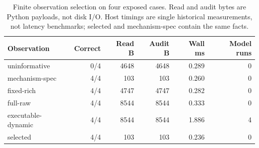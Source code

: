 \begin{table}[htbp]
\centering\small
\caption{Finite observation selection on four exposed cases. Read and audit bytes are Python payloads, not disk I/O. Host timings are single historical measurements, not latency benchmarks; selected and mechanism-spec contain the same facts.}
\label{tab:acquisition}
\begin{tabular}{@{}lrrrrr@{}}\toprule
Observation & Correct & Read B & Audit B & Wall ms & Model runs \\\midrule
uninformative & 0/4 & 4648 & 4648 & 0.289 & 0 \\
mechanism-spec & 4/4 & 103 & 103 & 0.260 & 0 \\
fixed-rich & 4/4 & 4747 & 4747 & 0.282 & 0 \\
full-raw & 4/4 & 8544 & 8544 & 0.333 & 0 \\
executable-dynamic & 4/4 & 8544 & 8544 & 1.886 & 4 \\
selected & 4/4 & 103 & 103 & 0.236 & 0 \\
\bottomrule\end{tabular}
\end{table}
